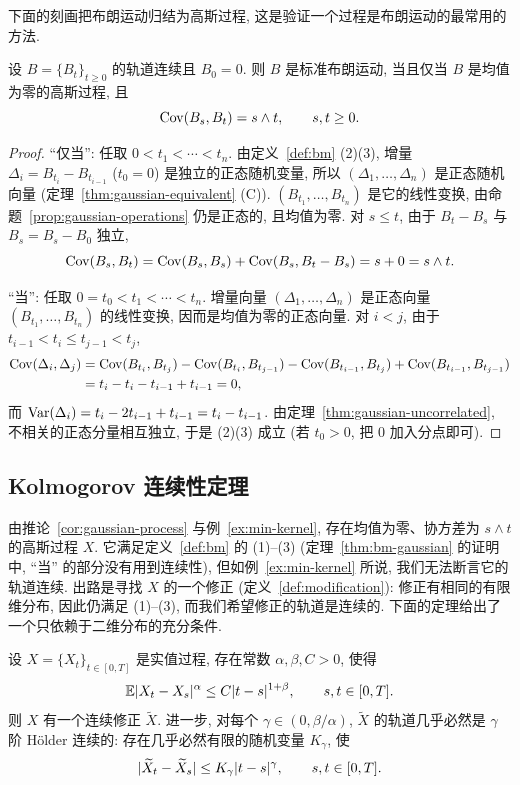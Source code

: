 下面的刻画把布朗运动归结为高斯过程, 这是验证一个过程是布朗运动的最常用的方法.

\begin{theorem}[布朗运动的高斯刻画]\label{thm:bm-gaussian}
设 $B=\{B_t\}_{t\ge0}$ 的轨道连续且 $B_0=0$. 则 $B$ 是标准布朗运动, 当且仅当 $B$ 是均值为零的高斯过程, 且
\[
\operatorname{Cov}(B_s,B_t)=s\wedge t,\qquad s,t\ge0.
\]
\end{theorem}

\begin{proof}
``仅当'': 任取 $0<t_1<\cdots<t_n$. 由定义~\ref{def:bm} (2)(3), 增量 $\Delta_i=B_{t_i}-B_{t_{i-1}}$ ($t_0=0$) 是独立的正态随机变量, 所以 $(\Delta_1,\dots,\Delta_n)$ 是正态随机向量 (定理~\ref{thm:gaussian-equivalent} (C)). $(B_{t_1},\dots,B_{t_n})$ 是它的线性变换, 由命题~\ref{prop:gaussian-operations} 仍是正态的, 且均值为零. 对 $s\le t$, 由于 $B_t-B_s$ 与 $B_s=B_s-B_0$ 独立,
\[
\operatorname{Cov}(B_s,B_t)=\operatorname{Cov}(B_s,B_s)+\operatorname{Cov}(B_s,B_t-B_s)=s+0=s\wedge t.
\]

``当'': 任取 $0=t_0<t_1<\cdots<t_n$. 增量向量 $(\Delta_1,\dots,\Delta_n)$ 是正态向量 $(B_{t_1},\dots,B_{t_n})$ 的线性变换, 因而是均值为零的正态向量. 对 $i<j$, 由于 $t_{i-1}<t_i\le t_{j-1}<t_j$,
\begin{align*}
\operatorname{Cov}(\Delta_i,\Delta_j)&=\operatorname{Cov}(B_{t_i},B_{t_j})-\operatorname{Cov}(B_{t_i},B_{t_{j-1}})-\operatorname{Cov}(B_{t_{i-1}},B_{t_j})+\operatorname{Cov}(B_{t_{i-1}},B_{t_{j-1}})\\
&=t_i-t_i-t_{i-1}+t_{i-1}=0,
\end{align*}
而 $\operatorname{Var}(\Delta_i)=t_i-2t_{i-1}+t_{i-1}=t_i-t_{i-1}$. 由定理~\ref{thm:gaussian-uncorrelated}, 不相关的正态分量相互独立, 于是 (2)(3) 成立 (若 $t_0>0$, 把 $0$ 加入分点即可).
\end{proof}

\subsection{Kolmogorov 连续性定理}

由推论~\ref{cor:gaussian-process} 与例~\ref{ex:min-kernel}, 存在均值为零、协方差为 $s\wedge t$ 的高斯过程 $X$. 它满足定义~\ref{def:bm} 的 (1)--(3) (定理~\ref{thm:bm-gaussian} 的证明中, ``当'' 的部分没有用到连续性), 但如例~\ref{ex:min-kernel} 所说, 我们无法断言它的轨道连续. 出路是寻找 $X$ 的一个修正 (定义~\ref{def:modification}): 修正有相同的有限维分布, 因此仍满足 (1)--(3), 而我们希望修正的轨道是连续的. 下面的定理给出了一个只依赖于二维分布的充分条件.

\begin{theorem}\label{thm:kolmogorov-chentsov}
设 $X=\{X_t\}_{t\in[0,T]}$ 是实值过程, 存在常数 $\alpha,\beta,C>0$, 使得
\begin{equation}\label{eq:kc-condition}
\mathbb{E}\lvert X_t-X_s\rvert^\alpha\le C\lvert t-s\rvert^{1+\beta},\qquad s,t\in[0,T].
\end{equation}
则 $X$ 有一个连续修正 $\widetilde{X}$. 进一步, 对每个 $\gamma\in(0,\beta/\alpha)$, $\widetilde{X}$ 的轨道几乎必然是 $\gamma$ 阶 H\"older 连续的: 存在几乎必然有限的随机变量 $K_\gamma$, 使
\[
\lvert\widetilde{X}_t-\widetilde{X}_s\rvert\le K_\gamma\lvert t-s\rvert^\gamma,\qquad s,t\in[0,T].
\]
\end{theorem}

